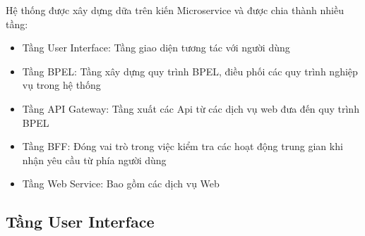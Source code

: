 Hệ thống được xây dựng dữa trên kiến Microservice và được chia thành nhiều tầng:
\begin{itemize}
	\item Tầng User Interface: Tầng giao diện tương tác với người dùng
	\item Tầng BPEL: Tầng xây dựng quy trình BPEL, điều phối các quy trình nghiệp vụ trong hệ thống
	\item Tầng API Gateway: Tầng xuất các Api từ các dịch vụ web đưa đến quy trình BPEL
	\item Tầng BFF: Đóng vai trò trong việc kiểm tra các hoạt động trung gian khi nhận yêu cầu từ phía người dùng
	\item Tầng Web Service: Bao gồm các dịch vụ Web
\end{itemize}


\subsection{Tầng User Interface}
